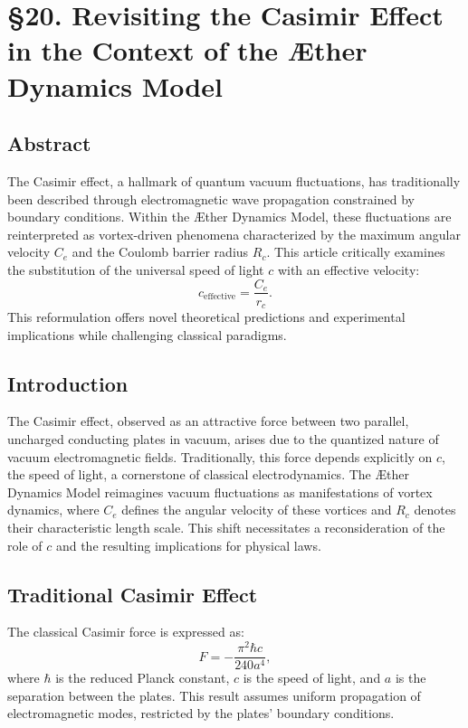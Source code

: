 

    \section*{§20. Revisiting the Casimir Effect in the Context of the Æther Dynamics Model}

    \subsection*{Abstract}
    The Casimir effect, a hallmark of quantum vacuum fluctuations, has traditionally been described through electromagnetic wave propagation constrained by boundary conditions. Within the Æther Dynamics Model, these fluctuations are reinterpreted as vortex-driven phenomena characterized by the maximum angular velocity $C_e$ and the Coulomb barrier radius $R_c$. This article critically examines the substitution of the universal speed of light $c$ with an effective velocity:
    \begin{equation}
        c_{\text{effective}} = \frac{C_e}{r_c}.
    \end{equation}
    This reformulation offers novel theoretical predictions and experimental implications while challenging classical paradigms.

    \subsection*{Introduction}
    The Casimir effect, observed as an attractive force between two parallel, uncharged conducting plates in vacuum, arises due to the quantized nature of vacuum electromagnetic fields. Traditionally, this force depends explicitly on $c$, the speed of light, a cornerstone of classical electrodynamics. The Æther Dynamics Model reimagines vacuum fluctuations as manifestations of vortex dynamics, where $C_e$ defines the angular velocity of these vortices and $R_c$ denotes their characteristic length scale. This shift necessitates a reconsideration of the role of $c$ and the resulting implications for physical laws.

    \subsection*{Traditional Casimir Effect}
    The classical Casimir force is expressed as:
    \begin{equation}
        F = -\frac{\pi^2 \hbar c}{240 a^4},
    \end{equation}
    where $\hbar$ is the reduced Planck constant, $c$ is the speed of light, and $a$ is the separation between the plates. This result assumes uniform propagation of electromagnetic modes, restricted by the plates' boundary conditions.

